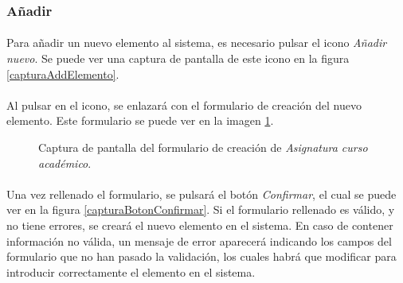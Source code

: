 \subsubsection{Añadir}

  \paragraph{}Para añadir un nuevo elemento al sistema, es necesario pulsar el
  icono \textit{Añadir nuevo}. Se puede ver una captura de pantalla de este
  icono en la figura \ref{capturaAddElemento}.

  \paragraph{}Al pulsar en el icono, se enlazará con el formulario de creación
  del nuevo elemento. Este formulario se puede ver en la imagen
  \ref{capturaAddAsignaturaCA}.

  \begin{figure}[!ht]
    \begin{center}
      \caption{Captura de pantalla del formulario de creación de \textit{Asignatura curso académico}.}
      \label{capturaAddAsignaturaCA}
    \end{center}
  \end{figure}

  \paragraph{}Una vez rellenado el formulario, se pulsará el botón
  \textit{Confirmar}, el cual se puede ver en la figura
  \ref{capturaBotonConfirmar}. Si el formulario rellenado es válido, y no tiene
  errores, se creará el nuevo elemento en el sistema. En caso de contener
  información no válida, un mensaje de error aparecerá indicando los campos
  del formulario que no han pasado la validación, los cuales habrá que modificar
  para introducir correctamente el elemento en el sistema.